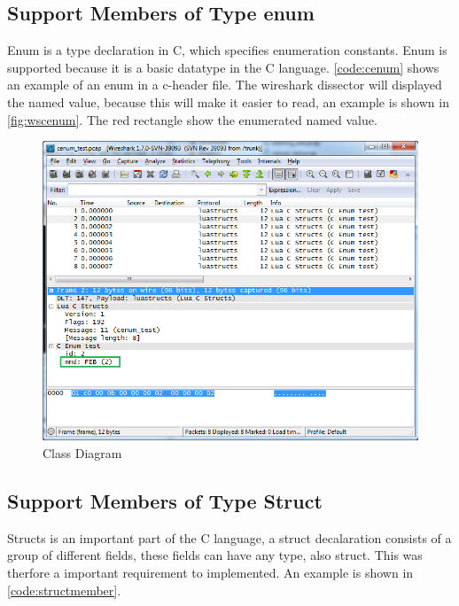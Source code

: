 \subsection{Support Members of Type enum}
\label{sec:support_enum}
Enum is a type declaration in C, which specifies enumeration constants.  Enum 
is supported because it is a basic datatype in the C language. 
\autoref{code:cenum} shows an example of an enum in a c-header file. The 
wireshark dissector will displayed the named value, because this will make it 
easier to read, an example is shown in \autoref{fig:wscenum}. The red 
rectangle show the enumerated named value.

\begin{figure}[ht]
	\center
	\includegraphics[width=\textwidth]{./sprints/img/wireshark_cenum}
	\caption{Class Diagram\label{fig:wscenum}}
\end{figure}



\subsection{Support Members of Type Struct}
Structs is an important part of the C language, a struct decalaration consists 
of a group of different fields, these fields can have any type, also struct. 
This was therfore a important requirement to implemented. An example is shown 
in \autoref{code:structmember}.

